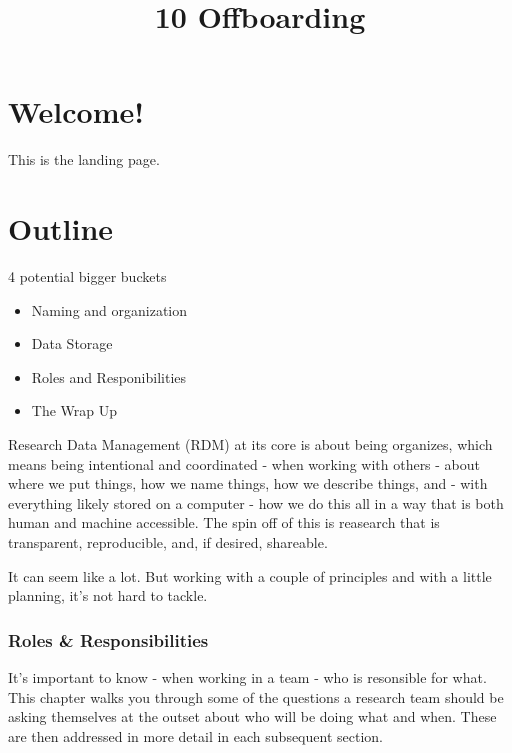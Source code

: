\documentclass[
]{book}
\title{10 Offboarding}
\author{}
\date{\vspace{-2.5em}}
\providecommand{\tightlist}{%
  \setlength{\itemsep}{0pt}\setlength{\parskip}{0pt}}
\begin{document}
\maketitle

{
\setcounter{tocdepth}{1}
\tableofcontents
}
\hypertarget{welcome}{%
\chapter*{Welcome!}\label{welcome}}

This is the landing page.

\hypertarget{outline}{%
\chapter*{Outline}\label{outline}}

4 potential bigger buckets

\begin{itemize}
\tightlist
\item
  Naming and organization
\item
  Data Storage
\item
  Roles and Responibilities
\item
  The Wrap Up
\end{itemize}

Research Data Management (RDM) at its core is about being organizes, which means being intentional and coordinated - when working with others - about where we put things, how we name things, how we describe things, and - with everything likely stored on a computer - how we do this all in a way that is both human and machine accessible. The spin off of this is reasearch that is transparent, reproducible, and, if desired, shareable.

It can seem like a lot. But working with a couple of principles and with a little planning, it's not hard to tackle.

\hypertarget{roles-responsibilities}{%
\subsection*{Roles \& Responsibilities}\label{roles-responsibilities}}

It's important to know - when working in a team - who is resonsible for what. This chapter walks you through some of the questions a research team should be asking themselves at the outset about who will be doing what and when. These are then addressed in more detail in each subsequent section.
\end{document}

